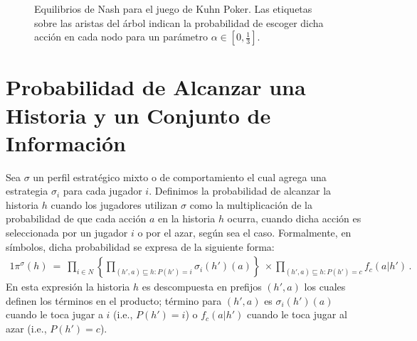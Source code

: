 \begin{figure}[h]
\begin{center}
\caption{Equilibrios de Nash para el juego de Kuhn Poker. Las etiquetas sobre las aristas del árbol indican la probabilidad de escoger dicha acción en cada nodo para un parámetro $\alpha \in \left[ 0,\frac{1}{3} \right]$.}
\label{fig:kuhn-poker-estrategias}
\end{center}
\end{figure}


\section{Probabilidad de Alcanzar una Historia y un Conjunto de Información}
\label{sec:probabilidad-historia}

Sea $\sigma$ un perfil estratégico mixto o de comportamiento el cual agrega una estrategia $\sigma_i$ para cada jugador $i$. Definimos la probabilidad de alcanzar la historia $h$ cuando los jugadores utilizan $\sigma$ como la multiplicación de la probabilidad de que cada acción $a$ en la historia $h$ ocurra, cuando dicha acción es seleccionada por un jugador $i$ o por el azar, según sea el caso. Formalmente, en símbolos, dicha probabilidad se expresa de la siguiente forma:
\begin{alignat}{1}
  \pi^\sigma(h)\
    =\ \prod_{i\in N} \left\{ \prod_{(h',a)\sqsubseteq h : P(h')=i} \sigma_i(h')(a) \right\}\ \times \prod_{(h',a)\sqsubseteq h : P(h')=c} f_c(a|h') \,. 
\end{alignat}
En esta expresión la historia $h$ es descompuesta en prefijos $(h',a)$ los cuales definen los términos en el producto; término para $(h',a)$ es $\sigma_i(h')(a)$ cuando le toca jugar a $i$ (i.e., $P(h')=i$) o $f_c(a|h')$ cuando le toca jugar al azar (i.e., $P(h')=c$).

